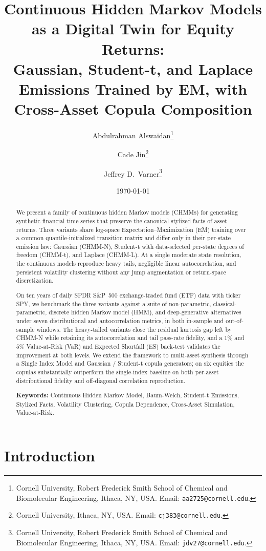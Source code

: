 \documentclass[11pt,a4paper]{article}
\title{Continuous Hidden Markov Models as a Digital Twin for Equity Returns:\\Gaussian, Student-t, and Laplace Emissions Trained by EM, with Cross-Asset Copula Composition}
\author{
    Abdulrahman Alswaidan\thanks{Cornell University, Robert Frederick Smith School of Chemical and Biomolecular Engineering, Ithaca, NY, USA. Email: \texttt{aa2725@cornell.edu}.}
    \and
    Cade Jin\thanks{Cornell University, Ithaca, NY, USA. Email: \texttt{cj383@cornell.edu}.}
    \and
    Jeffrey D.\ Varner\thanks{Cornell University, Robert Frederick Smith School of Chemical and Biomolecular Engineering, Ithaca, NY, USA. Email: \texttt{jdv27@cornell.edu}.}
}
\date{\today}
\begin{document}
\maketitle

\begin{abstract}
We present a family of continuous hidden Markov models (CHMMs) for generating synthetic financial time series that preserve the canonical stylized facts of asset returns.
Three variants share log-space Expectation--Maximization (EM) training over a common quantile-initialized transition matrix and differ only in their per-state emission law: Gaussian (CHMM-N), Student-t with data-selected per-state degrees of freedom (CHMM-t), and Laplace (CHMM-L).
At a single moderate state resolution, the continuous models reproduce heavy tails, negligible linear autocorrelation, and persistent volatility clustering without any jump augmentation or return-space discretization.

On ten years of daily SPDR S\&P~500 exchange-traded fund (ETF) data with ticker SPY, we benchmark the three variants against a suite of non-parametric, classical-parametric, discrete hidden Markov model (HMM), and deep-generative alternatives under seven distributional and autocorrelation metrics, in both in-sample and out-of-sample windows.
The heavy-tailed variants close the residual kurtosis gap left by CHMM-N while retaining its autocorrelation and tail pass-rate fidelity, and a $1\%$ and $5\%$ Value-at-Risk (VaR) and Expected Shortfall (ES) back-test validates the improvement at both levels.
We extend the framework to multi-asset synthesis through a Single Index Model and Gaussian / Student-t copula generators; on six equities the copulas substantially outperform the single-index baseline on both per-asset distributional fidelity and off-diagonal correlation reproduction.

\bigskip\noindent
\textbf{Keywords:} Continuous Hidden Markov Model, Baum-Welch, Student-t Emissions, Stylized Facts, Volatility Clustering, Copula Dependence, Cross-Asset Simulation, Value-at-Risk.
\end{abstract}

\section{Introduction}
\label{sec:introduction}

\end{document}
